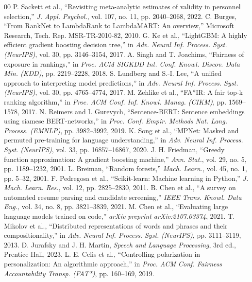 \documentclass[conference]{IEEEtran}
\begin{document}
\begin{thebibliography}{00}
 P. Sackett et al., ``Revisiting meta-analytic estimates of validity in personnel selection,'' \textit{J. Appl. Psychol.}, vol. 107, no. 11, pp. 2040--2068, 2022.
 C. Burges, ``From RankNet to LambdaRank to LambdaMART: An overview,'' Microsoft Research, Tech. Rep. MSR-TR-2010-82, 2010.
 G. Ke et al., ``LightGBM: A highly efficient gradient boosting decision tree,'' in \textit{Adv. Neural Inf. Process. Syst. (NeurIPS)}, vol. 30, pp. 3146--3154, 2017.
 A. Singh and T. Joachims, ``Fairness of exposure in rankings,'' in \textit{Proc. ACM SIGKDD Int. Conf. Knowl. Discov. Data Min. (KDD)}, pp. 2219--2228, 2018.
 S. Lundberg and S.-I. Lee, ``A unified approach to interpreting model predictions,'' in \textit{Adv. Neural Inf. Process. Syst. (NeurIPS)}, vol. 30, pp. 4765--4774, 2017.
 M. Zehlike et al., ``FA*IR: A fair top-k ranking algorithm,'' in \textit{Proc. ACM Conf. Inf. Knowl. Manag. (CIKM)}, pp. 1569--1578, 2017.
 N. Reimers and I. Gurevych, ``Sentence-BERT: Sentence embeddings using siamese BERT-networks,'' in \textit{Proc. Conf. Empir. Methods Nat. Lang. Process. (EMNLP)}, pp. 3982--3992, 2019.
 K. Song et al., ``MPNet: Masked and permuted pre-training for language understanding,'' in \textit{Adv. Neural Inf. Process. Syst. (NeurIPS)}, vol. 33, pp. 16857--16867, 2020.
 J. H. Friedman, ``Greedy function approximation: A gradient boosting machine,'' \textit{Ann. Stat.}, vol. 29, no. 5, pp. 1189--1232, 2001.
 L. Breiman, ``Random forests,'' \textit{Mach. Learn.}, vol. 45, no. 1, pp. 5--32, 2001.
 F. Pedregosa et al., ``Scikit-learn: Machine learning in Python,'' \textit{J. Mach. Learn. Res.}, vol. 12, pp. 2825--2830, 2011.
 B. Chen et al., ``A survey on automated resume parsing and candidate screening,'' \textit{IEEE Trans. Knowl. Data Eng.}, vol. 34, no. 8, pp. 3821--3839, 2021.
 M. Chen et al., ``Evaluating large language models trained on code,'' \textit{arXiv preprint arXiv:2107.03374}, 2021.
 T. Mikolov et al., ``Distributed representations of words and phrases and their compositionality,'' in \textit{Adv. Neural Inf. Process. Syst. (NeurIPS)}, pp. 3111--3119, 2013.
 D. Jurafsky and J. H. Martin, \textit{Speech and Language Processing}, 3rd ed., Prentice Hall, 2023.
 L. E. Celis et al., ``Controlling polarization in personalization: An algorithmic approach,'' in \textit{Proc. ACM Conf. Fairness Accountability Transp. (FAT*)}, pp. 160--169, 2019.

\end{thebibliography}
\end{document}
